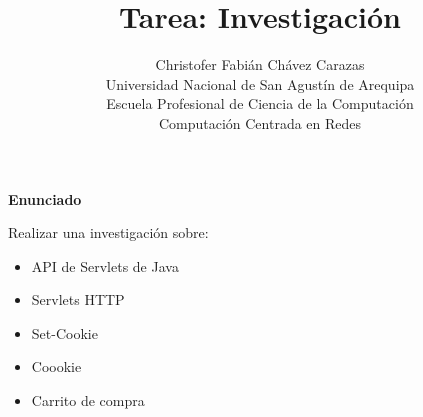 \documentclass[a4paper,12pt]{article}
\begin{document}
\title{Tarea: Investigación}
\author{
Christofer Fabián Chávez Carazas \\
\small{Universidad Nacional de San Agustín de Arequipa} \\
\small{Escuela Profesional de Ciencia de la Computación} \\
\small{Computación Centrada en Redes}
}
\date{}

\maketitle

\begin{large}
 \textbf{Enunciado}
\end{large}

Realizar una investigación sobre:
\begin{itemize}
 \item API de Servlets de Java
 \item Servlets HTTP
 \item Set-Cookie
 \item Coookie
 \item Carrito de compra
\end{itemize}
\end{document}
